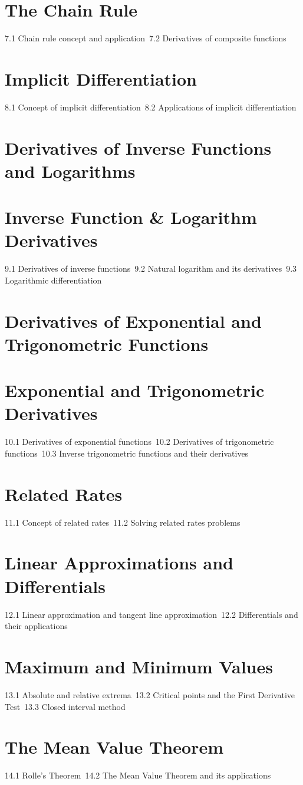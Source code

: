 \section{The Chain Rule}
7.1 Chain rule concept and application\
7.2 Derivatives of composite functions\
\section{Implicit Differentiation}
8.1 Concept of implicit differentiation\
8.2 Applications of implicit differentiation\
\section{Derivatives of Inverse Functions and Logarithms}
\section{Inverse Function \& Logarithm Derivatives}
9.1 Derivatives of inverse functions\
9.2 Natural logarithm and its derivatives\
9.3 Logarithmic differentiation\
\section{Derivatives of Exponential and Trigonometric Functions}
\section{Exponential and Trigonometric Derivatives}
10.1 Derivatives of exponential functions\
10.2 Derivatives of trigonometric functions\
10.3 Inverse trigonometric functions and their derivatives\
\section{Related Rates}
11.1 Concept of related rates\
11.2 Solving related rates problems\
\section{Linear Approximations and Differentials}
12.1 Linear approximation and tangent line approximation\
12.2 Differentials and their applications\
\section{Maximum and Minimum Values}
13.1 Absolute and relative extrema\
13.2 Critical points and the First Derivative Test\
13.3 Closed interval method\
\section{The Mean Value Theorem}
14.1 Rolle's Theorem\
14.2 The Mean Value Theorem and its applications\
